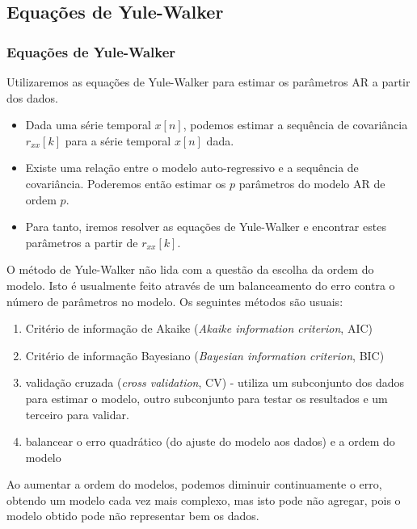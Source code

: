 \subsection{Equações de Yule-Walker}
\begin{frame}[allowframebreaks]
  \frametitle{Equações de Yule-Walker}
  Utilizaremos as equações de Yule-Walker para estimar os parâmetros AR
  a partir dos dados.
  \begin{itemize}
        \item Dada uma série temporal $x[n]$, podemos estimar a sequência de
        covariância $r_{xx}[k]$ para a série temporal $x[n]$ dada.
        \item Existe uma relação entre o modelo auto-regressivo e a sequência
        de covariância. Poderemos então estimar os $p$ parâmetros do modelo
        AR de ordem $p$.
        \item Para tanto, iremos resolver as equações de Yule-Walker e 
        encontrar estes parâmetros a partir de $r_{xx}[k]$.
  \end{itemize}

  \framebreak
  O método de Yule-Walker não lida com a questão da escolha da ordem do
  modelo. Isto é usualmente feito através de um balanceamento do erro
  contra o número de parâmetros no modelo. Os seguintes métodos
  são usuais:
  \begin{enumerate}
        \item Critério de informação de Akaike (\emph{Akaike information criterion}, AIC)
        \item Critério de informação Bayesiano (\emph{Bayesian information criterion}, BIC)
        \item validação cruzada (\emph{cross validation}, CV) - utiliza
        um subconjunto dos dados para estimar o modelo, outro subconjunto
        para testar os resultados e um terceiro para validar.
        \item balancear o erro quadrático (do ajuste do modelo
  aos dados) e a ordem do modelo
  \end{enumerate}
  Ao aumentar a ordem do modelos, podemos diminuir continuamente o erro,
  obtendo um modelo cada vez mais complexo, mas isto pode não agregar,
  pois o modelo obtido pode não representar bem os dados.
  
  \framebreak
  

\end{frame}
